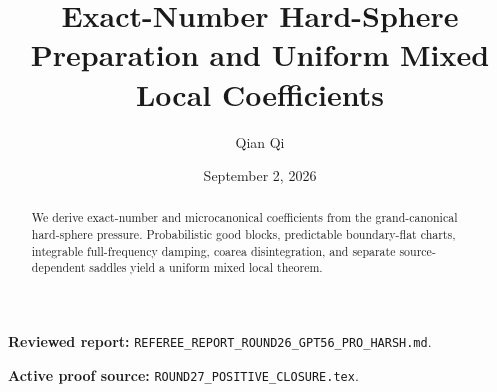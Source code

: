 \documentclass[11pt,reqno]{amsart}
\title[B1 Round 27 revision]{Exact-Number Hard-Sphere Preparation and Uniform Mixed Local Coefficients}
\author{Qian Qi}
\date{September 2, 2026}
\begin{document}
\begin{abstract}We derive exact-number and microcanonical coefficients from the grand-canonical hard-sphere pressure. Probabilistic good blocks, predictable boundary-flat charts, integrable full-frequency damping, coarea disintegration, and separate source-dependent saddles yield a uniform mixed local theorem.\end{abstract}
\maketitle
\noindent\textbf{Reviewed report:} \texttt{REFEREE\_REPORT\_ROUND26\_GPT56\_PRO\_HARSH.md}.\par
\noindent\textbf{Active proof source:} \texttt{ROUND27\_POSITIVE\_CLOSURE.tex}.\par

\end{document}
